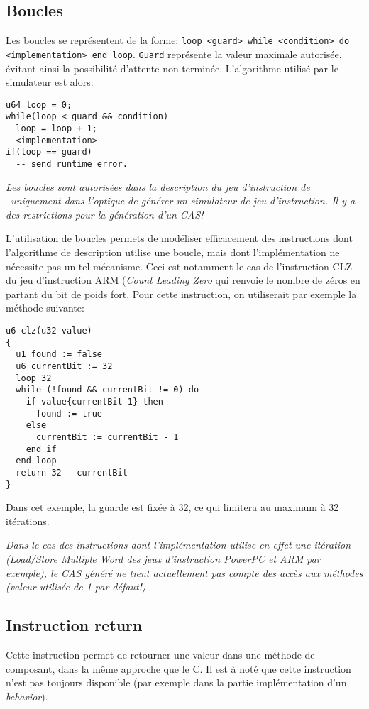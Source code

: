 \subsection{Boucles}
Les boucles se représentent de la forme: \texttt{loop <guard> while <condition> do <implementation> end loop}. \texttt{Guard} représente la valeur maximale autorisée, évitant ainsi la possibilité d'attente non terminée. L'algorithme utilisé par le simulateur est alors:
\begin{lstlisting}
u64 loop = 0;
while(loop < guard && condition)
  loop = loop + 1;
  <implementation>
if(loop == guard)
  -- send runtime error.
\end{lstlisting}

\emph{Les boucles sont autorisées dans la description du jeu d'instruction de \harmless\ uniquement dans l'optique de générer un simulateur de jeu d'instruction. Il y a des restrictions pour la génération d'un CAS!}

L'utilisation de boucles permets de modéliser efficacement des instructions dont l'algorithme de description utilise une boucle, mais dont l'implémentation ne nécessite pas un tel mécanisme. Ceci est notamment le cas de l'instruction CLZ du jeu d'instruction ARM (\emph{Count Leading Zero} qui renvoie le nombre de zéros en partant du bit de poids fort. Pour cette instruction, on utiliserait par exemple la méthode suivante:
\begin{lstlisting}
u6 clz(u32 value)
{
  u1 found := false
  u6 currentBit := 32
  loop 32 
  while (!found && currentBit != 0) do
    if value{currentBit-1} then 
      found := true
    else
      currentBit := currentBit - 1
    end if
  end loop
  return 32 - currentBit
}
\end{lstlisting}
Dans cet exemple, la guarde est fixée à 32, ce qui limitera au maximum à 32 itérations.

\emph{Dans le cas des instructions dont l'implémentation utilise en effet une itération (Load/Store Multiple Word des jeux d'instruction PowerPC et ARM par exemple), le CAS généré ne tient actuellement pas compte des accès aux méthodes (valeur utilisée de 1 par défaut!)
}
\subsection{Instruction return}
Cette instruction permet de retourner une valeur dans une méthode de composant, dans la même approche que le C. Il est à noté que cette instruction n'est pas toujours disponible (par exemple dans la partie implémentation d'un \emph{behavior}). 

